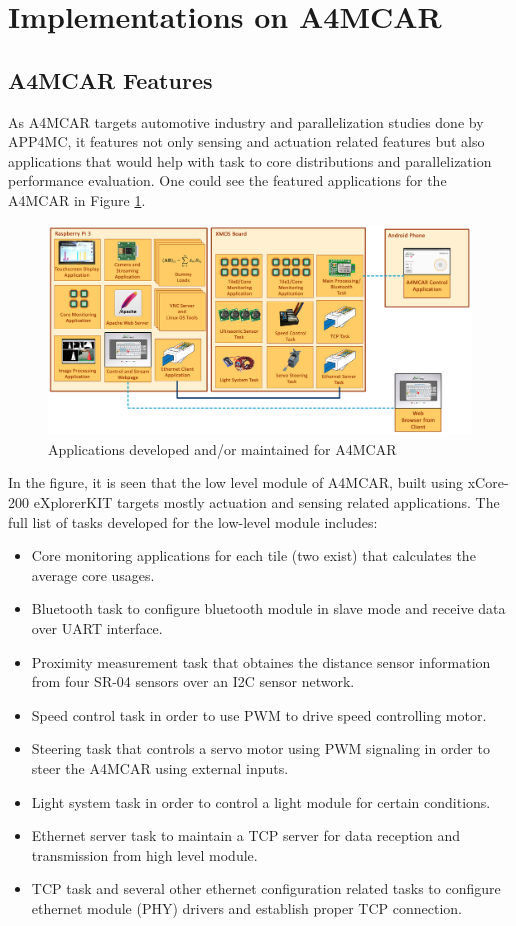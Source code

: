 \section{Implementations on A4MCAR}
\subsection{A4MCAR Features}
As A4MCAR targets automotive industry and parallelization studies done by APP4MC, it features not only sensing and actuation related features but also applications that would help with task to core distributions and parallelization performance evaluation. One could see the featured applications for the A4MCAR in Figure \ref{fig:tasksoverall}. 
\begin{figure}[!ht]
	\centering
	\includegraphics[scale=0.27]{content/images/tasksoverall.png}
	\caption{Applications developed and/or maintained for A4MCAR}
	\label{fig:tasksoverall}
\end{figure}
In the figure, it is seen that the low level module of A4MCAR, built using xCore-200 eXplorerKIT targets mostly actuation and sensing related applications. The full list of tasks developed for the low-level module includes:
\begin{itemize}
	\item Core monitoring applications for each tile (two exist) that calculates the average core usages.
	\item Bluetooth task to configure bluetooth module in slave mode and receive data over UART interface.
	\item Proximity measurement task that obtaines the distance sensor information from four SR-04 sensors over an I2C sensor network.
	\item Speed control task in order to use PWM to drive speed controlling motor.
	\item Steering task that controls a servo motor using PWM signaling in order to steer the A4MCAR using external inputs.
	\item Light system task in order to control a light module for certain conditions.
	\item Ethernet server task to maintain a TCP server for data reception and transmission from high level module.
	\item TCP task and several other ethernet configuration related tasks to configure ethernet module (PHY) drivers and establish proper TCP connection.
\end{itemize}

